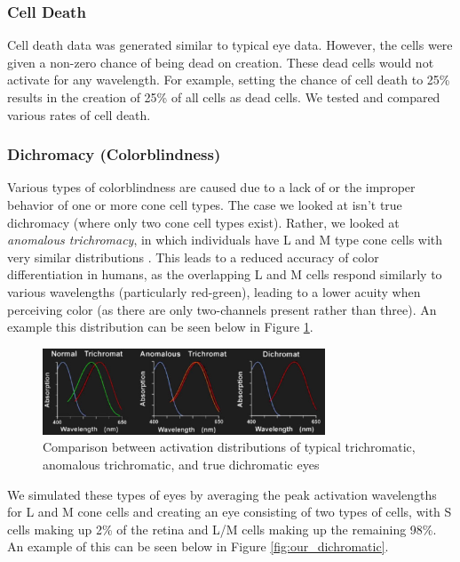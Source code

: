 \documentclass[titlepage]{article}
\begin{document}
\subsubsection{Cell Death}

Cell death data was generated similar to typical eye data. However, the cells were given a non-zero chance of being dead on creation. These dead cells would not activate for any wavelength. For example, setting the chance of cell death to 25\% results in the creation of 25\% of all cells as dead cells. We tested and compared various rates of cell death.

\subsubsection{Dichromacy (Colorblindness)}

Various types of colorblindness are caused due to a lack of or the improper behavior of one or more cone cell types. The case we looked at isn't true dichromacy (where only two cone cell types exist). Rather, we looked at \textit{anomalous trichromacy}, in which individuals have L and M type cone cells with very similar distributions \cite{colorblindgenetics}. This leads to a reduced accuracy of color differentiation in humans, as the overlapping L and M cells respond similarly to various wavelengths (particularly red-green), leading to a lower acuity when perceiving color (as there are only two-channels present rather than three). An example this distribution can be seen below in Figure \ref{fig:dichromatic_distribution}. 

\begin{figure}[H]
    \centering
    \includegraphics[width=0.75\textwidth]{figs/dichromatic_distribution.png}
    \caption{Comparison between activation distributions of typical trichromatic, anomalous trichromatic, and true dichromatic eyes \cite{anamoloustri}}
    \label{fig:dichromatic_distribution}
\end{figure}

We simulated these types of eyes by averaging the peak activation wavelengths for L and M cone cells and creating an eye consisting of two types of cells, with S cells making up 2\% of the retina and L/M cells making up the remaining 98\%. An example of this can be seen below in Figure \ref{fig:our_dichromatic}.
\end{document}
